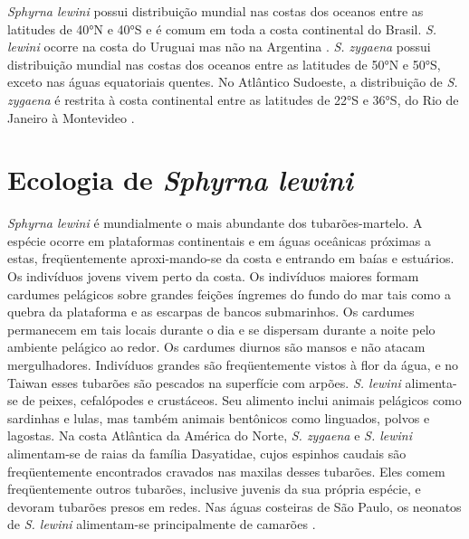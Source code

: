 \documentclass[a4paper,11pt,twoside,showtrims,onecolumn,openright,final]{memoir}
\begin{document}
\emph{Sphyrna lewini} possui distribuição mundial nas costas dos oceanos entre as latitudes 
de 40°N e 40°S e é comum em toda a costa continental do Brasil.  \emph{S. lewini} ocorre 
na costa do Uruguai mas não na Argentina \citep{COMPAGNO1984B,menni1984,soto2001a}. %
\emph{S. zygaena} possui distribuição mundial nas costas dos oceanos entre as latitudes de 50°N 
e 50°S, exceto nas águas equatoriais quentes. No Atlântico Sudoeste, a distribuição 
de \emph{S. zygaena}  é restrita à costa continental entre as latitudes de 22°S e 36°S, 
do Rio de Janeiro à Montevideo  \citep{COMPAGNO1984B,menni1984,soto2001a}. %

\section*{Ecologia de \emph{Sphyrna lewini}}

\emph{Sphyrna lewini} é mundialmente o mais abundante dos tubarões-martelo. A espécie ocorre em 
plataformas continentais e em águas oceânicas próximas a estas, freqüentemente aproxi-mando-se 
da costa e entrando em baías e estuários. Os indivíduos jovens vivem perto da costa. 
Os indivíduos maiores formam cardumes pelágicos sobre grandes feições íngremes do fundo do 
mar tais como a quebra da plataforma e as escarpas de bancos submarinhos. Os cardumes permanecem 
em tais locais durante o dia e se dispersam durante a noite pelo ambiente pelágico ao redor. 
Os cardumes diurnos são mansos e não atacam mergulhadores.  Indivíduos grandes são freqüentemente 
vistos à flor da água, e no Taiwan esses tubarões são pescados na superfície com arpões. \emph{S. lewini}
alimenta-se de peixes, cefalópodes e crustáceos. Seu alimento inclui animais pelágicos como 
sardinhas e lulas, mas também animais bentônicos como linguados,  polvos e lagostas. 
Na costa Atlântica da América do Norte, \emph{S. zygaena} e \emph{S. lewini} alimentam-se de raias 
da família Dasyatidae, cujos espinhos caudais são freqüentemente encontrados cravados nas 
maxilas desses tubarões. Eles comem freqüentemente outros tubarões, inclusive juvenis da 
sua própria espécie, e devoram tubarões presos em redes. Nas águas costeiras de São Paulo, 
os neonatos de \emph{S. lewini} alimentam-se principalmente de 
camarões \citep{bigelow1948,sadowsky1967,klimley1981,COMPAGNO1984B,chen1988}. %
\end{document}
